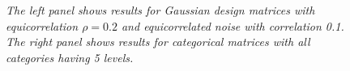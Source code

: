 \documentclass{imsart}
\begin{document}
\begin{figure}[h]
\begin{center}
\hspace{-15pt}
\caption{\small \it The left panel shows results for Gaussian design
matrices with equicorrelation $\rho=0.2$ and equicorrelated noise with
correlation 0.1. The right panel shows results for categorical matrices
with all categories having 5 levels.}
\end{center}
\end{figure}





\end{document}
